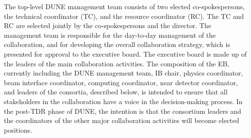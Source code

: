 The top-level DUNE management team consists of two elected co-spokespersons, the technical coordinator (TC), and the resource coordinator (RC). The TC and RC are selected jointly by the co-spokespersons and the \fnal director. The management team is responsible for the day-to-day management of the collaboration, and for developing the overall collaboration strategy, which is presented for approval to the executive board. The executive board is made up of the leaders of the main collaboration activities. The composition of the EB, currently including the DUNE management team, IB chair, physics coordinator, beam interface coordinator, computing coordinator, near detector coordinator, and leaders of the  consortia, described below, is intended to ensure
that all stakeholders in the collaboration have a voice in the decision-making process. 
In the post-TDR phase of DUNE, the intention is that the consortium leaders and the coordinators of the other major collaboration activities will become elected positions.

